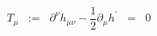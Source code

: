 \begin{equation}
T_{\mu} \;\; :=\;\; \partial^{\nu} h_{\mu\nu} - \frac{1}{2} 
\partial_{\mu} h^{\prime} \;\; =\;\; 0
\label{eq:a4}
\end{equation}

